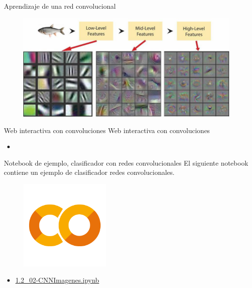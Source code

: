 \begin{frame}{Aprendizaje de una red convolucional}
\begin{figure}
    \centering
    \includegraphics[width=\textwidth]{Slides/figures/Tema 3/ConvHierarchy.png}
    \caption{\cite{siddiqui2018automatic}}
\end{figure}
\end{frame}




\begin{frame}{Web interactiva con convoluciones}
Web interactiva con convoluciones



\begin{itemize}
    \centering
    \item \Large {}
\end{itemize}
\end{frame}


\begin{frame}{Notebook de ejemplo, clasificador con redes convolucionales}
El siguiente notebook contiene un ejemplo de clasificador redes convolucionales.

\begin{figure}
    \centering
    \includegraphics[width=0.4\textwidth]{Slides/figures/GoogleColab.png}
\end{figure}
\begin{itemize}
    \centering
    \item {\Large \href{https://colab.research.google.com/github/guillermoih/M-todos-Generativos/blob/main/Notebooks/1.2_02-CNNImagenes.ipynb}{1.2\_02-CNNImagenes.ipynb}}
\end{itemize}
\end{frame}

